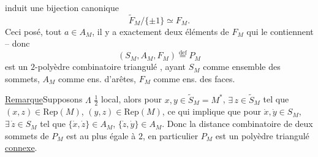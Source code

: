 induit une bijection canonique
\[
\widetilde F_M/\{\pm1\}\simeq F_M.\tag*{(22)}
\]
Ceci posé,  tout $a\in A_M$, il y a exactement deux éléments de $F_M$ qui le contiennent -- donc
\[
(S_M,A_M,F_M)\overset{\mathrm{def}}{=}P_M\tag*{(23)}
\]
est un $2$-polyèdre combinatoire triangulé , ayant $S_M$ comme ensemble des sommets, $A_M$ comme ens. d'arêtes, $F_M$ comme ens. des faces.

\uline{Remarque}\quad Supposons $\Lambda$ $\tfrac12$ local, alors pour $x,y\in\widetilde S_M=M^*$, $\exists\,z\in\widetilde S_M$ tel que $(x,z)\in\mathrm{Rep}(M)$, $(y,z)\in\mathrm{Rep}(M)$, ce qui implique que pour $\dot x,\dot y\in S_M$, $\exists\,\dot z\in S_M$ tel que $\{\dot x,\dot z\}\in A_M$, $\{\dot z,\dot y\}\in A_M$. Donc la distance combinatoire de deux  sommets de $P_M$ est au plus égale à $2$, en particulier $P_M$ est un polyèdre triangulé \uline{connexe}.
